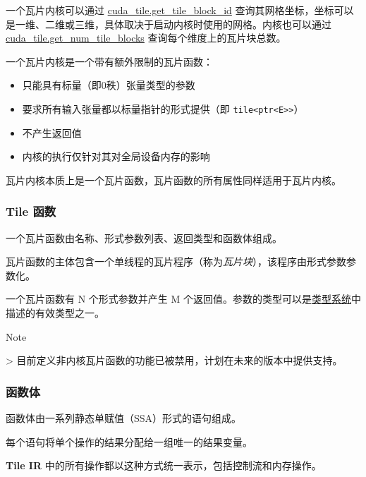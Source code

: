 \documentclass{article}
\begin{document}
一个瓦片内核可以通过 \href{https://docs.nvidia.com/cuda/tile-ir/latest/sections/operations.html#op-cuda-tile-get-tile-block-id}{cuda\_tile.get\_tile\_block\_id} 查询其网格坐标，坐标可以是一维、二维或三维，具体取决于启动内核时使用的网格。内核也可以通过 \href{https://docs.nvidia.com/cuda/tile-ir/latest/sections/operations.html#op-cuda-tile-get-num-tile-blocks}{cuda\_tile.get\_num\_tile\_blocks} 查询每个维度上的瓦片块总数。


一个瓦片内核是一个带有额外限制的瓦片函数：


\begin{itemize}
\item 只能具有标量（即0秩）张量类型的参数
\item 要求所有输入张量都以标量指针的形式提供（即 \texttt{tile<ptr<E>>}）
\item 不产生返回值
\item 内核的执行仅针对其对全局设备内存的影响

\end{itemize}
瓦片内核本质上是一个瓦片函数，瓦片函数的所有属性同样适用于瓦片内核。



\subsubsection{Tile 函数}

一个瓦片函数由名称、形式参数列表、返回类型和函数体组成。

瓦片函数的主体包含一个单线程的瓦片程序（称为\textit{瓦片块}），该程序由形式参数参数化。


一个瓦片函数有 N 个形式参数并产生 M 个返回值。参数的类型可以是\href{https://docs.nvidia.com/cuda/tile-ir/latest/sections/types.html#section-types}{类型系统}中描述的有效类型之一。


Note

> 目前定义非内核瓦片函数的功能已被禁用，计划在未来的版本中提供支持。



\subsubsection{函数体}

函数体由一系列静态单赋值（SSA）形式的语句组成。


每个语句将单个操作的结果分配给一组唯一的结果变量。

\textbf{Tile IR} 中的所有操作都以这种方式统一表示，包括控制流和内存操作。
\end{document}
